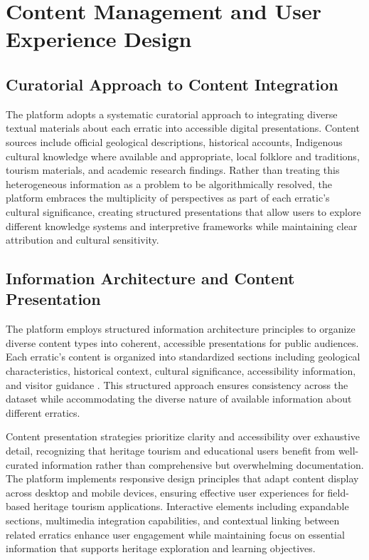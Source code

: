 \section{Content Management and User Experience Design}
\label{sec:content_ux}

\subsection{Curatorial Approach to Content Integration}
\label{subsec:content_integration}

The platform adopts a systematic curatorial approach to integrating diverse textual materials about each erratic into accessible digital presentations. Content sources include official geological descriptions, historical accounts, Indigenous cultural knowledge where available and appropriate, local folklore and traditions, tourism materials, and academic research findings. Rather than treating this heterogeneous information as a problem to be algorithmically resolved, the platform embraces the multiplicity of perspectives as part of each erratic's cultural significance, creating structured presentations that allow users to explore different knowledge systems and interpretive frameworks while maintaining clear attribution and cultural sensitivity.

\subsection{Information Architecture and Content Presentation}
\label{subsec:information_architecture}

The platform employs structured information architecture principles to organize diverse content types into coherent, accessible presentations for public audiences. Each erratic's content is organized into standardized sections including geological characteristics, historical context, cultural significance, accessibility information, and visitor guidance \cite{Manning2008, Jurafsky2009}. This structured approach ensures consistency across the dataset while accommodating the diverse nature of available information about different erratics.

Content presentation strategies prioritize clarity and accessibility over exhaustive detail, recognizing that heritage tourism and educational users benefit from well-curated information rather than comprehensive but overwhelming documentation. The platform implements responsive design principles that adapt content display across desktop and mobile devices, ensuring effective user experiences for field-based heritage tourism applications. Interactive elements including expandable sections, multimedia integration capabilities, and contextual linking between related erratics enhance user engagement while maintaining focus on essential information that supports heritage exploration and learning objectives.

